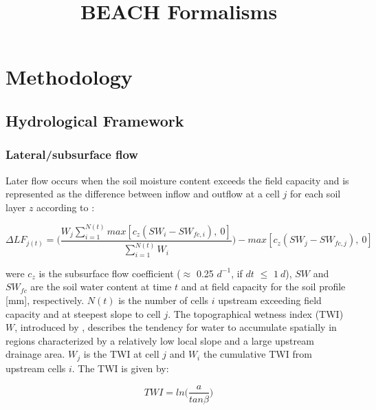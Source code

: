 \documentclass[]{article}
\title{BEACH Formalisms}
\author{}
\date{}
\begin{document}
\maketitle

\hypertarget{methodology}{%
\section{Methodology}\label{methodology}}

\hypertarget{hydrological-framework}{%
\subsection{Hydrological Framework}\label{hydrological-framework}}

\hypertarget{lateralsubsurface-flow}{%
\subsubsection{Lateral/subsurface flow}\label{lateralsubsurface-flow}}

Later flow occurs when the soil moisture content exceeds the field
capacity and is represented as the difference between inflow and outflow
at a cell \(j\) for each soil layer \(z\) according to
\cite{Manfreda2005}:

\begin{equation}
\Delta LF_{j(t)} = \Big( \frac{W_{j} \sum^{N(t)}_{i=1}max[c_{z}(SW_{i}-SW_{fc,i}),~0] }{ \sum^{N(t)}_{i=1} W_{i} } \Big) - max[c_z(SW_j-SW_{fc,j}),~0]
\label{eq:LF}  
\end{equation}

were \(c_z\) is the subsurface flow coefficient (\(\approx\) 0.25
\(d^{-1}\), if \(dt\) \(\leq\) \(1~d\)), \(SW\) and \(SW_{fc}\) are the
soil water content at time \(t\) and at field capacity for the soil
profile {[}mm{]}, respectively. \(N(t)\) is the number of cells \(i\)
upstream exceeding field capacity and at steepest slope to cell \(j\).
The topographical wetness index (TWI) \(W\), introduced by
\cite{Beven1979}, describes the tendency for water to accumulate
spatially in regions characterized by a relatively low local slope and a
large upstream drainage area. \(W_j\) is the TWI at cell \(j\) and
\(W_i\) the cumulative TWI from upstream cells \(i\). The TWI is given
by:

\begin{equation}
TWI =ln\Big(\frac{a}{tan \beta} \Big)
\label{eq:Wz}  
\end{equation}
\end{document}
